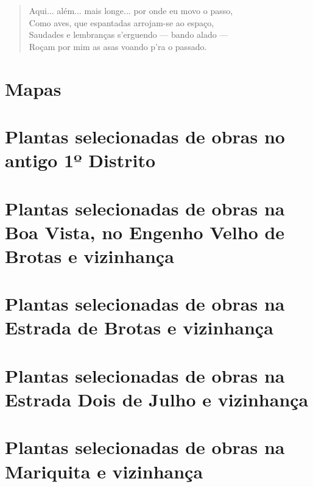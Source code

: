 \begin{anexosenv}
\begin{verse}
Aqui... além... mais longe... por onde eu movo o passo, \\
Como aves, que espantadas arrojam-se ao espaço, \\
Saudades e lembranças s'erguendo — bando alado — \\
Roçam por mim as asas voando p'ra o passado. \\
\end{verse}


\chapter{Mapas}\label{anexo-mapas}



\chapter{Plantas selecionadas de obras no antigo 1º Distrito}



\chapter{Plantas selecionadas de obras na Boa Vista, no Engenho Velho de Brotas e vizinhança}



\chapter{Plantas selecionadas de obras na Estrada de Brotas e vizinhança}



\chapter{Plantas selecionadas de obras na Estrada Dois de Julho e vizinhança}



\chapter{Plantas selecionadas de obras na Mariquita e vizinhança}


\end{anexosenv}
